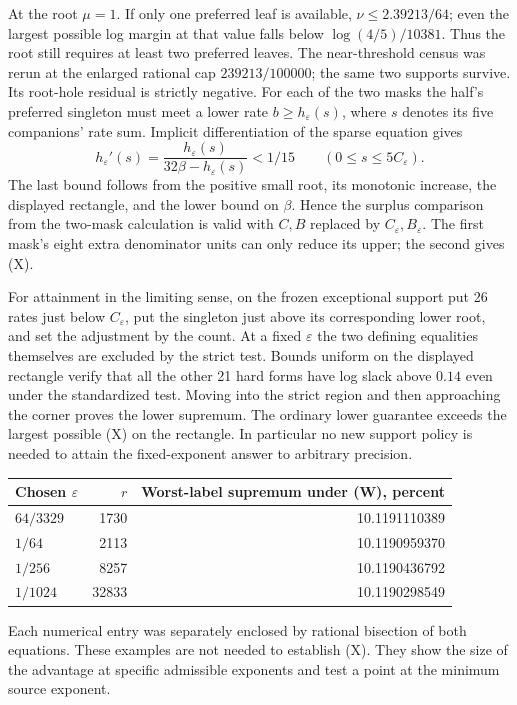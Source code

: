 At the root \(\mu=1\). If only one preferred leaf is available, \(\nu\le 2.39213/64\); even the largest possible log margin at that value falls below \(\log(4/5)/10381\). Thus the root still requires at least two preferred leaves. The near-threshold census was rerun at the enlarged rational cap \(239213/100000\); the same two supports survive. Its root-hole residual is strictly negative. For each of the two masks the half's preferred singleton must meet a lower rate \(b\ge h_\varepsilon(s)\), where \(s\) denotes its five companions' rate sum. Implicit differentiation of the sparse equation gives
\[
 h_\varepsilon'(s)=
   \frac{h_\varepsilon(s)}{32\beta-h_\varepsilon(s)}<1/15
       \qquad (0\le s\le5C_\varepsilon).
\]
The last bound follows from the positive small root, its monotonic increase, the displayed rectangle, and the lower bound on \(\beta\). Hence the surplus comparison from the two-mask calculation is valid with \(C,B\) replaced by \(C_\varepsilon,B_\varepsilon\). The first mask's eight extra denominator units can only reduce its upper; the second gives (X).

For attainment in the limiting sense, on the frozen exceptional support put 26 rates just below \(C_\varepsilon\), put the singleton just above its corresponding lower root, and set the adjustment by the count. At a fixed \(\varepsilon\) the two defining equalities themselves are excluded by the strict test. Bounds uniform on the displayed rectangle verify that all the other 21 hard forms have log slack above \(0.14\) even under the standardized test. Moving into the strict region and then approaching the corner proves the lower supremum. The ordinary lower guarantee exceeds the largest possible (X) on the rectangle. In particular no new support policy is needed to attain the fixed-exponent answer to arbitrary precision.

\begin{center}\small\begin{tabular}{@{}lrr@{}}\toprule
Chosen \(\varepsilon\)& \(r\)&Worst-label supremum under (W), percent\\\midrule
\(64/3329\)&1730&10.1191110389\\
\(1/64\)&2113&10.1190959370\\
\(1/256\)&8257&10.1190436792\\
\(1/1024\)&32833&10.1190298549\\\bottomrule
\end{tabular}\end{center}
Each numerical entry was separately enclosed by rational bisection of both equations. These examples are not needed to establish (X). They show the size of the advantage at specific admissible exponents and test a point at the minimum source exponent.

